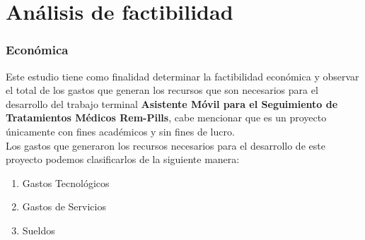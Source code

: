 %	
%
%	
%	
%	
%	
%	

\section{Análisis de factibilidad}
\subsubsection{Económica}

Este estudio tiene como finalidad determinar la factibilidad económica y observar el total de los gastos que generan los recursos que son necesarios para el desarrollo del trabajo terminal \textbf{ Asistente Móvil para el Seguimiento de Tratamientos Médicos Rem-Pills}, cabe mencionar que es un proyecto únicamente con fines académicos y sin fines de lucro.\\

Los gastos que generaron los recursos necesarios para el desarrollo de este proyecto podemos clasificarlos de la siguiente manera:

\begin{enumerate}
	\item Gastos Tecnológicos
	\item Gastos de Servicios
	\item Sueldos
\end{enumerate}

